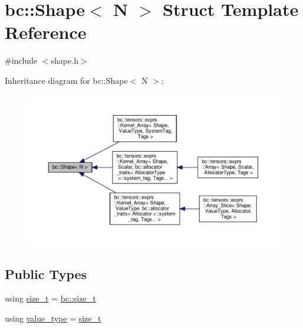 \hypertarget{structbc_1_1Shape}{}\section{bc\+:\+:Shape$<$ N $>$ Struct Template Reference}
\label{structbc_1_1Shape}


{\ttfamily \#include $<$shape.\+h$>$}



Inheritance diagram for bc\+:\+:Shape$<$ N $>$\+:\nopagebreak
\begin{figure}[H]
\begin{center}
\leavevmode
\includegraphics[width=350pt]{structbc_1_1Shape__inherit__graph}
\end{center}
\end{figure}
\subsection*{Public Types}
\begin{DoxyCompactItemize}
\item 
using \hyperlink{structbc_1_1Shape_a63f974ebdb0e3755ef3140b17abcf235}{size\+\_\+t} = \hyperlink{namespacebc_aaf8e3fbf99b04b1b57c4f80c6f55d3c5}{bc\+::size\+\_\+t}
\item 
using \hyperlink{structbc_1_1Shape_a52aafd6585a5eae8a3b82f650d3afc1c}{value\+\_\+type} = \hyperlink{structbc_1_1Shape_a63f974ebdb0e3755ef3140b17abcf235}{size\+\_\+t}
\end{DoxyCompactItemize}
